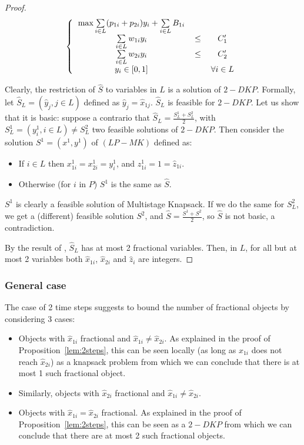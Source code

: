 \documentclass[a4paper]{book}
\newtheorem{proof}{\noindent{\bf Proof.} }
\begin{document}
\begin{proof}
\vspace{-0.5cm}

\[ \left \{ 
\begin{tabular}{ccc}
$ \max \sum\limits_{i \in L} (p_{1i}+p_{2i})y_{i}+\sum\limits_{i \in L} B_{1i}$\\
$  \sum\limits_{i \in L} w_{1i}y_{i}$ & $ \leq $ & $C_1'$\\
$  \sum\limits_{i \in L} w_{2i}y_{i}$ & $ \leq $ & $C_2'$\\
$y_{i} \in [0,1] $&&$\forall i \in L$ \\
\end{tabular} 
\right.
\] 

Clearly, the restriction of $\hat{S}$ to variables in $L$ is a solution of $2-DKP$. Formally, let $\hat{S}_L=(\hat{y}_j, j\in L)$ defined as $\hat{y}_j=\hat{x}_{1j}$. $\hat{S}_L$ is feasible for $2-DKP$. Let us show that it is basic: suppose a contrario that $\hat{S}_L=\frac{S^1_L+S^2_L}{2}$, with $S^1_L=(y^1_i,i\in L)\neq S^2_L$ two feasible solutions of  $2-DKP$. Then consider the solution $S^1=(x^1,y^1)$ of $(LP-MK)$ defined as:
\begin{itemize}
	\item If $i\in L$ then $x^1_{1i}=x^1_{2i}=y^1_i$, and $z^{1}_{1i}=1=\hat{z}_{1i}$.
	\item Otherwise (for $i$ in $P$) $S^1$ is the same as $\hat{S}$. 
\end{itemize}
$S^1$ is clearly a feasible solution of {\sc Multistage  Knapsack}. If we do the same for $S^2_L$, we get a (different) feasible solution $S^2$, and $\hat{S}=\frac{S^1+S^2}{2}$, so $\hat{S}$ is not basic, a contradiction. 

By the result of \cite{Carpara}, $\hat{S}_L$ has at most 2 fractional variables. Then, in $L$, for all but at most 2 variables both $\hat{x}_{1i}$, $\hat{x}_{2i}$ and $\hat{z}_i$ are integers.   
\end{proof}


\subsubsection{General case}

The case of 2 time steps suggests to bound the number of fractional objects by considering 3 cases:
\begin{itemize}
	\item Objects with $\hat{x}_{1i}$ fractional and $\hat{x}_{1i}\neq \hat{x}_{2i}$. As explained in the proof of Proposition~\ref{lem:2steps}, this can be seen locally (as long as $x_{1i}$ does not reach $\hat{x}_{2i}$) as a knapsack problem from which we can conclude that there is at most 1 such fractional object.
	\item Similarly, objects with $\hat{x}_{2i}$ fractional and $\hat{x}_{1i}\neq \hat{x}_{2i}$.
	\item Objects with $\hat{x}_{1i}=\hat{x}_{2i}$ fractional. As explained in the proof of Proposition~\ref{lem:2steps}, this can be seen as a $2-DKP$ from which we can conclude that there are at most 2 such fractional objects.
\end{itemize}
\end{document}
